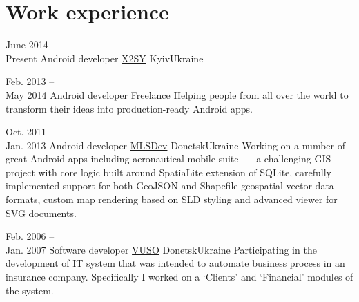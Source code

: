 \medskip
\section{Work experience}

\cventry
    {June 2014 --\\Present}
    {Android developer}
    {\href{http://x2sy.com/}{X2SY}}
    {Kyiv}{Ukraine}
    {
        \iftoggle{is_nda_compliant}
            {
                Building Android app with advanced media playback features for
                an industry-leading local OTT service.\newline
            }
            {
                Building Android app with advanced media playback features for
                \href{http://megogo.net/}{MEGOGO.NET}~--- an industry-leading 
                local OTT service.
                Working on the implementation of the proprietary VAST-compliant 
                video player which supports HLS adaptive playbacks through the 
                use of the Google's recent ExoPlayer library as well as more 
                traditional MediaPlayer API in conjunction with SolBox and 
                Vitamio third-party SDKs.\newline
            }
    }

\cventry
    {Feb. 2013 --\\May 2014}
    {Android developer}
    {Freelance}
    {}{}
    {Helping people from all over the world to transform their ideas into 
    production-ready Android apps.\newline}

\cventry
    {Oct. 2011 --\\Jan. 2013}
    {Android developer}
    {\href{http://mlsdev.com/}{MLSDev}}
    {Donetsk}{Ukraine}
    {Working on a number of great Android apps including aeronautical mobile 
    suite~--- a challenging GIS project with core logic built around SpatiaLite 
    extension of SQLite, carefully implemented support for both GeoJSON and 
    Shapefile geospatial vector data formats, custom map rendering based on SLD 
    styling and advanced viewer for SVG documents.\newline}

\cventry
    {Feb. 2006 --\\Jan. 2007}
    {Software developer}
    {\href{http://vuso.ua/}{VUSO}}
    {Donetsk}{Ukraine}
    {Participating in the development of IT system that was intended to 
    automate business process in an insurance company. Specifically I worked on 
    a `Clients' and `Financial' modules of the system.}


